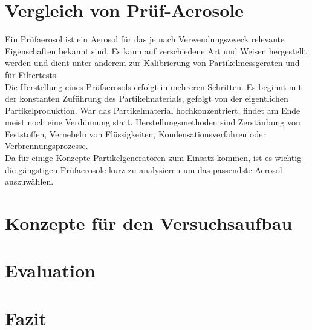 \chapter{Vergleich von Pr\"{u}f-Aerosole}\label{ch:aerosol}
Ein Pr\"{u}faerosol ist ein Aerosol f\"{u}r das je nach Verwendungszweck relevante Eigenschaften bekannt sind. Es kann auf verschiedene Art und Weisen hergestellt werden und dient unter anderem zur Kalibrierung von Partikelmessger\"{a}ten und f\"{u}r Filtertests.\\
Die Herstellung eines Pr\"{u}faerosols erfolgt in mehreren Schritten. Es beginnt mit der konstanten Zuf\"{u}hrung des Partikelmaterials, gefolgt von der eigentlichen Partikelproduktion. War das Partikelmaterial hochkonzentriert, findet am Ende meist noch eine Verd\"{u}nnung statt. Herstellungsmethoden sind Zerst\"{a}ubung von Feststoffen, Vernebeln von Fl\"{u}ssigkeiten, Kondensationsverfahren oder Verbrennungsprozesse.\\
Da f\"{u}r einige Konzepte Partikelgeneratoren zum Einsatz kommen, ist es wichtig die g\"{a}ngstigen Pr\"{u}faerosole kurz zu analysieren um das passendste Aerosol auszuw\"{a}hlen.







\chapter{Konzepte f\"{u}r den Versuchsaufbau}\label{ch:concepts}









\chapter{Evaluation}\label{ch:evaluation}




\chapter{Fazit}\label{ch:conclusion}




